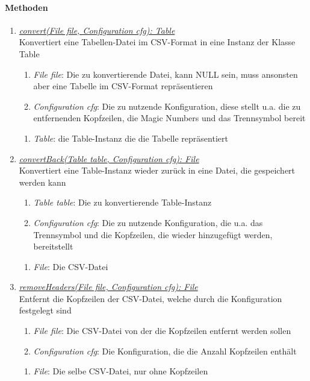 \paragraph{Methoden}

\begin{enumerate}[+]
	\item \underline{\textit{convert(File file, Configuration cfg): Table}} \\
	Konvertiert eine Tabellen-Datei im CSV-Format in eine Instanz der Klasse Table
	
	\begin{enumerate}[$\bullet$]
		\item \textit{File file}: Die zu konvertierende Datei, kann NULL sein, muss ansonsten aber eine Tabelle im CSV-Format repräsentieren
		\item \textit{Configuration cfg}: Die zu nutzende Konfiguration, diese stellt u.a. die zu entfernenden Kopfzeilen, die Magic Numbers und das Trennsymbol bereit
	\end{enumerate}
	\vspace{-0.2cm}
	\begin{enumerate}[$\circ$]
		\item \textit{Table}: die Table-Instanz die die Tabelle repräsentiert
	\end{enumerate}
	
	\item \underline{\textit{convertBack(Table table, Configuration cfg): File}} \\
	Konvertiert eine Table-Instanz wieder zurück in eine Datei, die gespeichert werden kann
	\begin{enumerate}[$\bullet$]
		\item \textit{Table table}: Die zu konvertierende Table-Instanz
		\item \textit{Configuration cfg}: Die zu nutzende Konfiguration, die u.a. das Trennsymbol und die Kopfzeilen, die wieder hinzugefügt werden, bereitstellt
	\end{enumerate}
	\vspace{-0.2cm}
	\begin{enumerate}[$\circ$]
		\item \textit{File}: Die CSV-Datei
	\end{enumerate}

	\item \underline{\textit{removeHeaders(File file, Configuration cfg): File}} \\
	Entfernt die Kopfzeilen der CSV-Datei, welche durch die Konfiguration festgelegt sind
	\begin{enumerate}[$\bullet$]
		\item \textit{File file}: Die CSV-Datei von der die Kopfzeilen entfernt werden sollen
		\item \textit{Configuration cfg}: Die Konfiguration, die die Anzahl Kopfzeilen enthält
	\end{enumerate}
	\vspace{-0.2cm}
	\begin{enumerate}[$\circ$]
		\item \textit{File}: Die selbe CSV-Datei, nur ohne Kopfzeilen
	\end{enumerate}
\end{enumerate}

